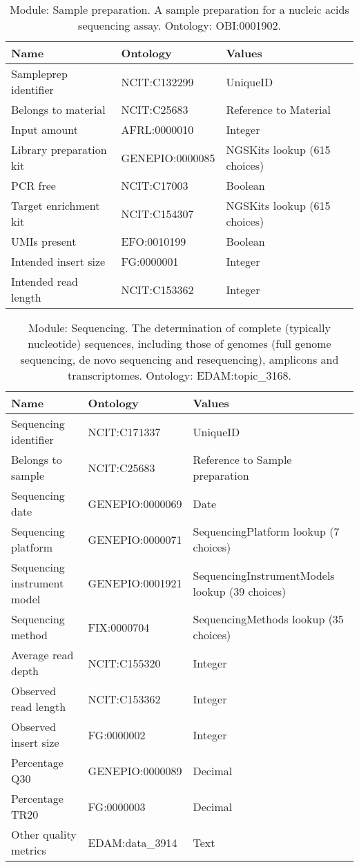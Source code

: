 \documentclass{article}
\begin{document}
\begin{table}[htb]
\begin{tabular}{lll}
Name & Ontology & Values \\
\hline
Sampleprep identifier & NCIT:C132299 & UniqueID \\
Belongs to material & NCIT:C25683 & Reference to Material \\
Input amount & AFRL:0000010 & Integer \\
Library preparation kit & GENEPIO:0000085 & NGSKits lookup (615 choices) \\
PCR free & NCIT:C17003 & Boolean \\
Target enrichment kit & NCIT:C154307 & NGSKits lookup (615 choices) \\
UMIs present & EFO:0010199 & Boolean \\
Intended insert size & FG:0000001 & Integer \\
Intended read length & NCIT:C153362 & Integer \\
\hline
\end{tabular}
\caption[Module: Sample preparation]{\label{table:table8} Module: Sample preparation. A sample preparation for a nucleic acids sequencing assay. Ontology: OBI:0001902. }
\end{table}

\begin{table}[htb]
\begin{tabular}{lll}
Name & Ontology & Values \\
\hline
Sequencing identifier & NCIT:C171337 & UniqueID \\
Belongs to sample & NCIT:C25683 & Reference to Sample preparation \\
Sequencing date & GENEPIO:0000069 & Date \\
Sequencing platform & GENEPIO:0000071 & SequencingPlatform lookup (7 choices) \\
Sequencing instrument model & GENEPIO:0001921 & SequencingInstrumentModels lookup (39 choices) \\
Sequencing method & FIX:0000704 & SequencingMethods lookup (35 choices) \\
Average read depth & NCIT:C155320 & Integer \\
Observed read length & NCIT:C153362 & Integer \\
Observed insert size & FG:0000002 & Integer \\
Percentage Q30 & GENEPIO:0000089 & Decimal \\
Percentage TR20 & FG:0000003 & Decimal \\
Other quality metrics & EDAM:data\_3914 & Text \\
\hline
\end{tabular}
\caption[Module: Sequencing]{\label{table:table9} Module: Sequencing. The determination of complete (typically nucleotide) sequences, including those of genomes (full genome sequencing, de novo sequencing and resequencing), amplicons and transcriptomes. Ontology: EDAM:topic\_3168. }
\end{table}
\end{document}
